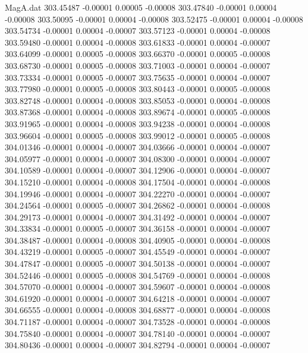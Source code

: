 \begin{filecontents}{MagA.dat}
 303.45487   -0.00001    0.00005   -0.00008
 303.47840   -0.00001    0.00004   -0.00008
 303.50095   -0.00001    0.00004   -0.00008
 303.52475   -0.00001    0.00004   -0.00008
 303.54734   -0.00001    0.00004   -0.00007
 303.57123   -0.00001    0.00004   -0.00008
 303.59480   -0.00001    0.00004   -0.00008
 303.61833   -0.00001    0.00004   -0.00007
 303.64099   -0.00001    0.00005   -0.00008
 303.66370   -0.00001    0.00005   -0.00008
 303.68730   -0.00001    0.00005   -0.00008
 303.71003   -0.00001    0.00004   -0.00007
 303.73334   -0.00001    0.00005   -0.00007
 303.75635   -0.00001    0.00004   -0.00007
 303.77980   -0.00001    0.00005   -0.00008
 303.80443   -0.00001    0.00005   -0.00008
 303.82748   -0.00001    0.00004   -0.00008
 303.85053   -0.00001    0.00004   -0.00008
 303.87368   -0.00001    0.00004   -0.00008
 303.89674   -0.00001    0.00005   -0.00008
 303.91965   -0.00001    0.00004   -0.00008
 303.94238   -0.00001    0.00004   -0.00008
 303.96604   -0.00001    0.00005   -0.00008
 303.99012   -0.00001    0.00005   -0.00008
 304.01346   -0.00001    0.00004   -0.00007
 304.03666   -0.00001    0.00004   -0.00007
 304.05977   -0.00001    0.00004   -0.00007
 304.08300   -0.00001    0.00004   -0.00007
 304.10589   -0.00001    0.00004   -0.00007
 304.12906   -0.00001    0.00004   -0.00007
 304.15210   -0.00001    0.00004   -0.00008
 304.17504   -0.00001    0.00004   -0.00008
 304.19946   -0.00001    0.00004   -0.00007
 304.22270   -0.00001    0.00004   -0.00007
 304.24564   -0.00001    0.00005   -0.00007
 304.26862   -0.00001    0.00004   -0.00008
 304.29173   -0.00001    0.00004   -0.00007
 304.31492   -0.00001    0.00004   -0.00007
 304.33834   -0.00001    0.00005   -0.00007
 304.36158   -0.00001    0.00004   -0.00007
 304.38487   -0.00001    0.00004   -0.00008
 304.40905   -0.00001    0.00004   -0.00008
 304.43219   -0.00001    0.00005   -0.00007
 304.45549   -0.00001    0.00004   -0.00007
 304.47847   -0.00001    0.00005   -0.00007
 304.50138   -0.00001    0.00004   -0.00007
 304.52446   -0.00001    0.00005   -0.00008
 304.54769   -0.00001    0.00004   -0.00008
 304.57070   -0.00001    0.00004   -0.00007
 304.59607   -0.00001    0.00004   -0.00008
 304.61920   -0.00001    0.00004   -0.00007
 304.64218   -0.00001    0.00004   -0.00007
 304.66555   -0.00001    0.00004   -0.00008
 304.68877   -0.00001    0.00004   -0.00008
 304.71187   -0.00001    0.00004   -0.00007
 304.73528   -0.00001    0.00004   -0.00008
 304.75840   -0.00001    0.00004   -0.00007
 304.78140   -0.00001    0.00004   -0.00007
 304.80436   -0.00001    0.00004   -0.00007
 304.82794   -0.00001    0.00004   -0.00007

\end{filecontents}
